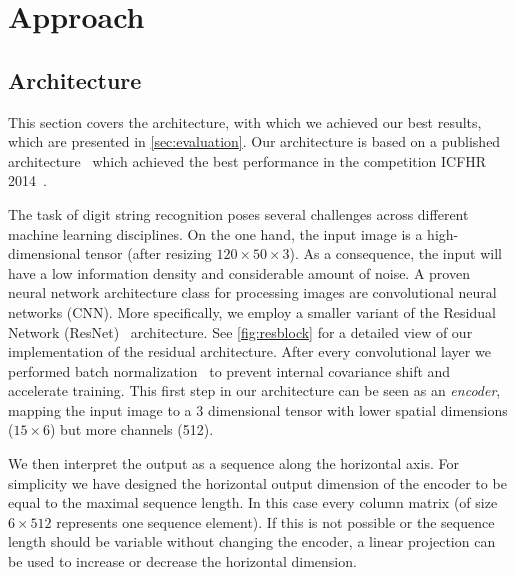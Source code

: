 \section{Approach}\label{sec:approach}

\subsection{Architecture}\label{subsec:architecture}
This section covers the architecture, with which we achieved our best results, which are presented in \autoref{sec:evaluation}. Our architecture is based on a published architecture~\cite{CTC} which achieved the best performance in the competition ICFHR 2014~\cite{icfhr_competition}.

The task of digit string recognition poses several challenges across different machine learning disciplines.
On the one hand, the input image is a high-dimensional tensor (after resizing $120\times50\times3$).
As a consequence, the input will have a low information density and considerable amount of noise.
A proven neural network architecture class for processing images are convolutional neural networks (CNN).
More specifically, we employ a smaller variant of the Residual Network (ResNet)~\cite{ResNet} architecture.
See \autoref{fig:resblock} for a detailed view of our implementation of the residual architecture.
After every convolutional layer we performed batch normalization~\cite{batchnorm} to prevent internal covariance shift and accelerate training.
This first step in our architecture can be seen as an \emph{encoder}, mapping the input image to a 3 dimensional tensor with lower spatial dimensions ($15 \times 6$) but more channels (512).

We then interpret the output as a sequence along the horizontal axis.
For simplicity we have designed the horizontal output dimension of the encoder to be equal to the maximal sequence length.
In this case every column matrix (of size $6 \times 512$ represents one sequence element).
If this is not possible or the sequence length should be variable without changing the encoder, a linear projection can be used to increase or decrease the horizontal dimension.

